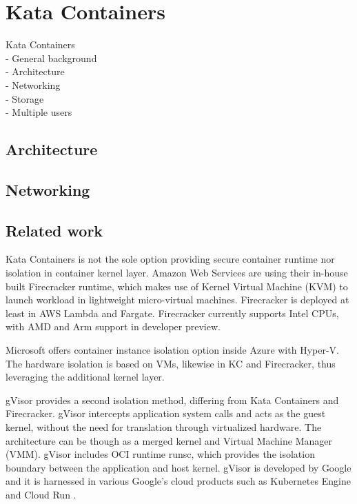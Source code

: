 \chapter{Kata Containers}
\label{chapter:katacontainers}

Kata Containers \\
    - General background \\
    - Architecture \\
    - Networking \\
    - Storage \\
    - Multiple users \\
    
\section{Architecture}

\section{Networking}

\section{Related work}

Kata Containers is not the sole option providing secure container runtime nor isolation in container kernel layer. Amazon Web Services are using their in-house built Firecracker runtime, which makes use of Kernel Virtual Machine (KVM) to launch workload in lightweight micro-virtual machines. Firecracker is deployed at least in AWS Lambda and Fargate. Firecracker currently supports Intel CPUs, with AMD and Arm support in developer preview. \cite{AWS}\cite{Debab2021}

Microsoft offers container instance isolation option inside Azure with Hyper-V. The hardware isolation is based on VMs, likewise in KC and Firecracker, thus leveraging the additional kernel layer. \cite{Hyper-V}

gVisor provides a second isolation method, differing from Kata Containers and Firecracker. gVisor intercepts application system calls and acts as the guest kernel, without the need for translation through virtualized hardware. The architecture can be though as a merged kernel and Virtual Machine Manager (VMM). gVisor includes OCI runtime runsc, which provides the isolation boundary between the application and host kernel. gVisor is developed by Google and it is harnessed in various Google's cloud products such as Kubernetes Engine \cite{GKE} and Cloud Run \cite{CloudRun}. \cite{gVisor}\cite{Debab2021}

